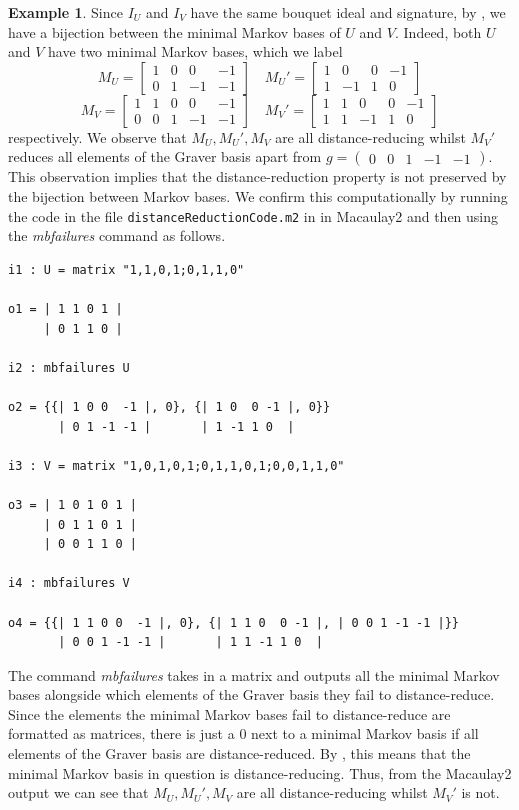 \documentclass[a4paper, 12pt]{article}
\theoremstyle{plain}
\theoremstyle{definition}
\newtheorem{example}[theorem]{Example}
\theoremstyle{remark}
\begin{document}
\begin{example}
Since $I_U$ and $I_V$ have the same bouquet ideal and signature, by \cite{kosta2023strongly}, we have a bijection between the minimal Markov bases of $U$ and $V$. Indeed, both $U$ and $V$ have two minimal Markov bases, which we label  
$$M_U=\begin{bmatrix} 1&0&0&-1\\0&1&-1&-1\end{bmatrix} \quad M_U'=\begin{bmatrix} 1&0&0&-1\\1&-1&1&0\end{bmatrix}$$
$$M_V=\begin{bmatrix} 1&1&0&0&-1\\0&0&1&-1&-1\end{bmatrix} \quad M_V'=\begin{bmatrix} 1&1&0&0&-1\\1&1&-1&1&0\end{bmatrix}$$ 
respectively. We observe that $M_U,M_U',M_V$ are all distance-reducing whilst $M_V'$ reduces all elements of the Graver basis apart from $g=\begin{pmatrix} 0&0&1&-1&-1\end{pmatrix}$. This observation implies that the distance-reduction property is not preserved by the bijection between Markov bases. We confirm this computationally by running the code in the file \texttt{distanceReductionCode.m2} in \cite{githubM2DistanceReduction}
in Macaulay2 \cite{M2} and then using the \textit{mbfailures} command as follows.


\begin{lstlisting}
i1 : U = matrix "1,1,0,1;0,1,1,0"

o1 = | 1 1 0 1 |
     | 0 1 1 0 |

i2 : mbfailures U

o2 = {{| 1 0 0  -1 |, 0}, {| 1 0  0 -1 |, 0}}
       | 0 1 -1 -1 |       | 1 -1 1 0  |

i3 : V = matrix "1,0,1,0,1;0,1,1,0,1;0,0,1,1,0"

o3 = | 1 0 1 0 1 |
     | 0 1 1 0 1 |
     | 0 0 1 1 0 |

i4 : mbfailures V

o4 = {{| 1 1 0 0  -1 |, 0}, {| 1 1 0  0 -1 |, | 0 0 1 -1 -1 |}}
       | 0 0 1 -1 -1 |       | 1 1 -1 1 0  |
\end{lstlisting}

The command \textit{mbfailures} takes in a matrix and outputs all the minimal Markov bases alongside which elements of the Graver basis they fail to distance-reduce. Since the elements the minimal Markov bases fail to distance-reduce are formatted as matrices, there is just a $0$ next to a minimal Markov basis if all elements of the Graver basis are distance-reduced. By \cite[Theorem 7.4]{CK_2024}, this means that the minimal Markov basis in question is distance-reducing. Thus, from the Macaulay2 output we can see that $M_U,M_U',M_V$ are all distance-reducing whilst $M_V'$ is not.




\end{example}
\end{document}
